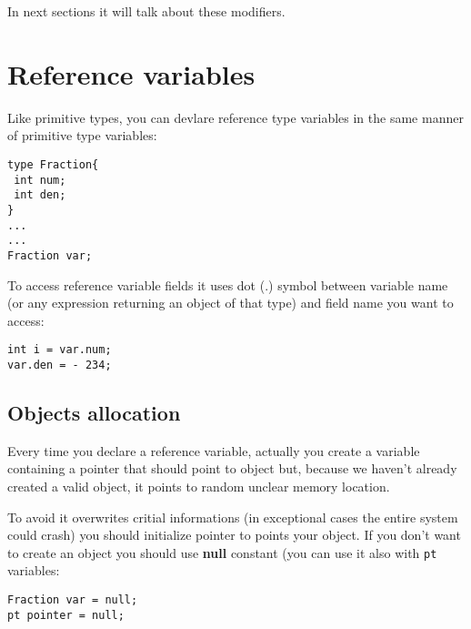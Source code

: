 \documentclass[10pt]{book}%
\newcommand{\code}[1]{\texttt{#1}}
\renewcommand{\emph}[1]{\textbf{#1}}
\newenvironment{codeenv}{
\begin{mdframed}[backgroundcolor=black!20,topline=false,leftline=false,rightline=false,bottomline=false]
}
{\end{mdframed}}
\begin{document}
In next sections it will talk about these modifiers.

\section{Reference variables}
Like primitive types, you can devlare reference type variables in the same manner of primitive type variables:
\begin{codeenv}
\begin{verbatim}
type Fraction{
 int num;
 int den;
}
...
...
Fraction var;
\end{verbatim}
\end{codeenv}
To access reference variable fields it uses dot (.) symbol between variable name (or any expression returning an object of that type) and field name you want to access:
\begin{codeenv}
\begin{verbatim}
int i = var.num;
var.den = - 234;
\end{verbatim}
\end{codeenv}

\subsection{Objects allocation}
Every time you declare a reference variable, actually you create a variable containing a pointer that should point to object but, because we haven't already created a valid object, it points to random unclear memory location.

To avoid it overwrites critial informations (in exceptional cases the entire system could crash) you should initialize pointer to points your object. If you don't want to create an object you should use \emph{null} constant (you can use it also with \code{pt} variables:
\begin{codeenv}
\begin{verbatim}
Fraction var = null;
pt pointer = null;
\end{verbatim}
\end{codeenv}
\end{document}
